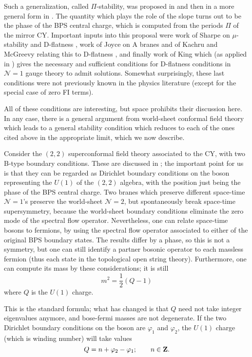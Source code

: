 \documentclass[a4paper,12pt]{amsart}
\numberwithin{equation}{section}
\theoremstyle{plain}
\theoremstyle{definition}
\def\Bbb#1{{\fam\black\relax#1}}
\def\Bbb{\bf}
\def\grade{\varphi}
\def\cal{\mathcal}
\def\BZ{\Bbb{Z}}
\def\CN{{\cal N}}
\begin{document}
Such a generalization, called $\Pi$-stability, was proposed in
\cite{DFR} and then in a more general form in \cite{DCS}.  The
quantity which plays the role of the slope turns out to be the phase
of the BPS central charge, which is computed from the periods $\Pi$ of
the mirror CY. Important inputs into this proposal were work of Sharpe
on $\mu$-stability and D-flatness \cite{Sharpe}, work of Joyce on A
branes \cite{Joyce} and of Kachru and McGreevy relating this to
D-flatness \cite{KachruMac}, and finally work of King \cite{King}
which (as applied in \cite{DFR}) gives the necessary and sufficient
conditions for D-flatness conditions in $\CN=1$ gauge theory to admit
solutions. Somewhat surprisingly, these last conditions were not
previously known in the physics literature (except for the special
case of zero FI terms).

All of these conditions are interesting, but space prohibits their
discussion here.  In any case, there is a general argument from
world-sheet conformal field theory \cite{DCS} which leads to a general
stability condition which reduces to each of the ones cited above in
the appropriate limit, which we now describe.

Consider the $(2,2)$ superconformal field theory associated to the CY,
with two B-type boundary conditions.  These are discussed in
\cite{OOY}; the important point for us is that they can be regarded as
Dirichlet boundary conditions on the boson representing the $U(1)$ of
the $(2,2)$ algebra, with the position just being the phase of the BPS
central charge.  Two branes which preserve different space-time $\CN=1$'s
preserve the world-sheet $\CN=2$, but spontaneously break space-time
supersymmetry, because the world-sheet boundary conditions eliminate
the zero mode of the spectral flow operator.  Nevertheless,
one can relate space-time bosons to fermions, by using the spectral
flow operator associated to either of the original BPS boundary states.
The results differ by a phase, so this is not a symmetry, but
one can still identify a partner bosonic operator to each massless
fermion (thus each state in the topological open string theory).
Furthermore, one can compute its mass by these considerations; it is still
\begin{equation} \label{eq:mass}
m^2 = \frac{1}{2} (Q-1)
\end{equation}
where $Q$ is the $U(1)$ charge.

This is the standard formula; what has changed is that $Q$ need not
take integer eigenvalues anymore, and bose-fermi masses are not degenerate.
If the two Dirichlet boundary conditions
on the boson are $\grade_1$ and $\grade_2$, the $U(1)$ charge (which is
winding number) will take values 
\begin{equation} \label{eq:qcharge}
Q = n+\grade_2-\grade_1; \qquad n\in\BZ.
\end{equation}
\end{document}
